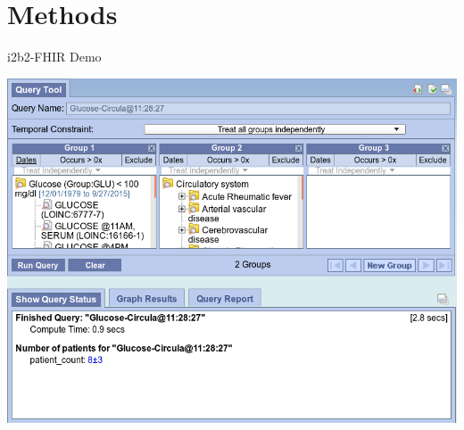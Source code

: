 \documentclass[10pt]{beamer}
\begin{document}
\section{Methods}
\begin{frame}{i2b2-FHIR Demo}{}
\begin{center}
\href{run:demo.mov}{
\includegraphics[scale=0.25]
{images/demo.png}}
\end{center}
\end{frame}
\end{document}

